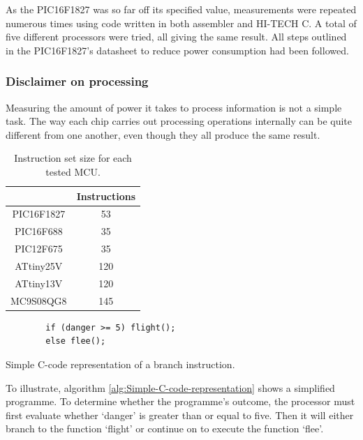       As the PIC16F1827 was so far off its specified value, measurements were repeated numerous times using code written in both assembler and HI-TECH C.
      A total of five different processors were tried, all giving the same result.
      All steps outlined in the PIC16F1827's datasheet to reduce power consumption had been followed.


    \subsubsection*{Disclaimer on processing}


      Measuring the amount of power it takes to process information is not a simple task.
      The way each chip carries out processing operations internally can be quite different from one another, even though they
      all produce the same result.

      \begin{table}
        \centering
        \begin{tabular}{|c|c|}
          \cline{2-2}
          \multicolumn{1}{c|}{} & Instructions\tabularnewline
          \hline
          PIC16F1827 & 53\tabularnewline
          \hline
          PIC16F688 & 35\tabularnewline
          \hline
          PIC12F675 & 35\tabularnewline
          \hline
          ATtiny25V & 120\tabularnewline
          \hline
          ATtiny13V & 120\tabularnewline
          \hline
          MC9S08QG8 & 145\tabularnewline
          \hline
        \end{tabular}
        \caption{\label{tab:Number-of-instructions}Instruction set size for each tested MCU.}
      \end{table}


      \begin{algorithm}
        \begin{lstlisting}
        if (danger >= 5) flight();
        else flee();
        \end{lstlisting}
        \caption{\label{alg:Simple-C-code-representation}Simple C-code representation of a branch instruction.}
      \end{algorithm}


      To illustrate, algorithm \ref{alg:Simple-C-code-representation} shows a simplified programme.
      To determine whether the programme's outcome, the processor must first evaluate whether `danger' is greater than or equal to five.
      Then it will either branch to the function `flight' or continue on to execute the function `flee'.


